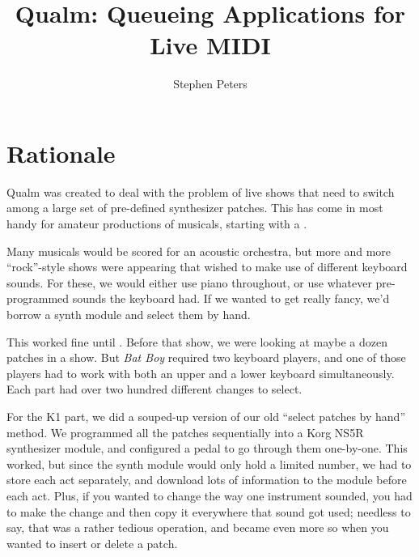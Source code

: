 \documentclass{article}
\newcommand{\q}{{\textsf{Qualm}}\xspace}
\begin{document}
\title{\textbf{\q:} Queueing Applications for Live MIDI}
\author{Stephen Peters}
\maketitle

\section{Rationale}

\q was created to deal with the problem of live shows that need to
switch among a large set of pre-defined synthesizer patches.  This has
come in most handy for amateur productions of musicals, starting with
a .

Many musicals would be scored for an acoustic orchestra, but more and
more ``rock''-style shows were appearing that wished to make use of
different keyboard sounds.  For these, we would either use piano
throughout, or use whatever pre-programmed sounds the keyboard had.
If we wanted to get really fancy, we'd borrow a synth module and
select them by hand.

This worked fine until .  Before
that show, we were looking at maybe a dozen patches in a show.  But
{\em Bat Boy} required two keyboard players, and one of those players
had to work with both an upper and a lower keyboard simultaneously.
Each part had over two hundred different changes to select.

For the K1 part, we did a souped-up version of our old ``select
patches by hand'' method.  We programmed all the patches sequentially
into a Korg NS5R synthesizer module, and configured a pedal to go
through them one-by-one.  This worked, but since the synth module
would only hold a limited number, we had to store each act separately,
and download lots of information to the module before each act.  Plus,
if you wanted to change the way one instrument sounded, you had to
make the change and then copy it everywhere that sound got used;
needless to say, that was a rather tedious operation, and became even
more so when you wanted to insert or delete a patch.
\end{document}

